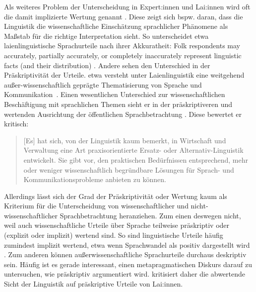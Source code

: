 Als weiteres Problem der Unterscheidung in Expert:innen und Lai:innen wird oft die damit implizierte Wertung genannt \citep[s.][320]{Spitzmuller2014}. 
Diese zeigt sich bspw. daran, dass die Linguistik die wissenschaftliche Einschätzung sprachlicher Phänomene als Maßstab für die \glqq richtige\grqq{} Interpretation sieht. 
So unterscheidet etwa \citet{Preston2004} laienlinguistische Sprachurteile nach ihrer Akkuratheit: \glqq Folk respondents may accurately, partially accurately, or completely inaccurately represent linguistic facts (and their distribution)\grqq{} \citep[45]{Preston2004}. 
Andere sehen den Unterschied in der Präskriptivität der Urteile.  
\citeauthor{Antos1996} etwa versteht unter Laienlinguistik {\glqq}eine weitgehend au{\ss}er-wissenschaftlich gepr{\"a}gte Thematisierung von Sprache und Kommunikation{\grqq}~\citep[25--26]{Antos1996}. 
Einen wesentlichen Unterschied zur wissenschaftlichen Beschäftigung mit sprachlichen Themen sieht er in der präskriptiveren und wertenden Ausrichtung der öffentlichen Sprachbetrachtung \citep[19--20, 36]{Antos1996}. 
Diese bewertet er kritisch: 
\begin{quote}[Es] hat sich, von der Linguistik kaum bemerkt, in Wirtschaft und Verwaltung eine Art praxisorientierte {\glq}Ersatz-{\grq} oder {\glq}Alternativ-Linguistik{\grq} entwickelt. Sie gibt vor, den praktischen Bed{\"u}rfnissen entsprechend, mehr oder weniger wissenschaftlich begr{\"u}ndbare L{\"o}sungen f{\"u}r Sprach- und Kommunikationsprobleme anbieten zu k{\"o}nnen.~\citep[25]{Antos1996}\end{quote}
Allerdings lässt sich der Grad der Präskriptivität oder Wertung kaum als Kriterium für die Unterscheidung von wissenschaftlicher und nicht-wissenschaftlicher Sprachbetrachtung heranziehen. 
Zum einen deswegen nicht, weil auch wissenschaftliche Urteile über Sprache teilweise präskriptiv oder (explizit oder implizit) wertend sind. 
So sind linguistische Urteile häufig zumindest implizit wertend, etwa wenn Sprachwandel als positiv dargestellt wird \citep[s.][549--250]{Spitzmuller.2005}.
Zum anderen können außerwissenschaftliche Sprachurteile durchaus deskriptiv sein. 
Häufig ist es gerade interessant, einen metapragmatischen Diskurs darauf zu untersuchen, wie präskriptiv argumentiert wird. 
\citet[314]{Spitzmuller2014} kritisiert daher die abwertende Sicht der Linguistik auf präskriptive Urteile von Lai:innen. 

